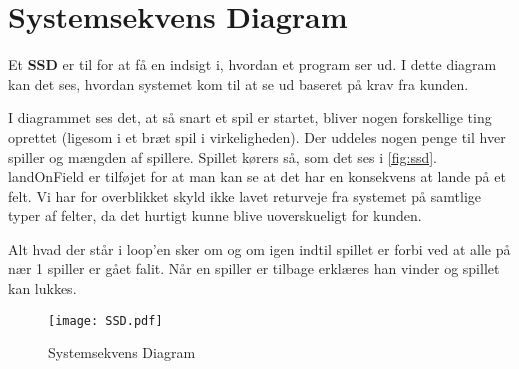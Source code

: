 \section{Systemsekvens Diagram}
Et \textbf{SSD} er til for at få en indsigt i, hvordan et program ser ud. I dette diagram kan det ses, hvordan systemet kom til at se ud baseret på krav fra kunden.

I diagrammet ses det, at så snart et spil er startet, bliver nogen forskellige ting oprettet (ligesom i et bræt spil i virkeligheden). Der uddeles nogen penge til hver spiller og mængden af spillere. 
Spillet kørers så, som det ses i \vref{fig:ssd}. landOnField er tilføjet for at man kan se at det har en konsekvens at lande på et felt. Vi har for overblikket skyld ikke lavet returveje fra systemet på samtlige typer af felter, da det hurtigt kunne blive uoverskueligt for kunden. 

Alt hvad der står i loop'en sker om og om igen indtil spillet er forbi ved at alle på nær 1 spiller er gået falit. Når en spiller er tilbage erklæres han vinder og spillet kan lukkes.
\begin{figure}[!ht]
\centering
\texttt{[image: SSD.pdf]}
\caption[<Text for the list of figures>]{Systemsekvens Diagram}
\label{fig:ssd} 
\end{figure}
\newpage